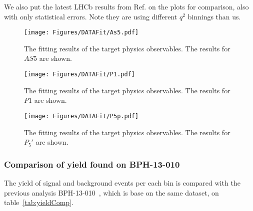 We also put the latest LHCb results from Ref.\cite{LHCbP5p} on the plots for comparison, also with only statistical errors.
Note they are using different $q^2$ binnings than us.


\begin{figure}[!hbtp]
  \centering
  \texttt{[image: Figures/DATAFit/As5.pdf]}
  \caption{The fitting results of the target physics observables.
    The results for $AS5$ are shown.}
  \label{fig:fitresultAs5}
\end{figure}



\begin{figure}[!hbtp]
  \centering
  \texttt{[image: Figures/DATAFit/P1.pdf]}
  \caption{The fitting results of the target physics observables.
    The results for $P1$ are shown.}
  \label{fig:fitresultP1}
\end{figure}


\begin{figure}[!hbtp]
  \centering
  \texttt{[image: Figures/DATAFit/P5p.pdf]}
  \caption{The fitting results of the target physics observables.
    The results for $P_5'$  are shown.}
  \label{fig:fitresultp5}
\end{figure}

\subsubsection{Comparison of yield found on BPH-13-010}\label{sec:yieldComp}

The yield of signal and background events per each bin is compared with the previous analysis BPH-13-010~\cite{AN-14-129}, which is base on the same dataset, on table~\ref{tab:yieldComp}.

